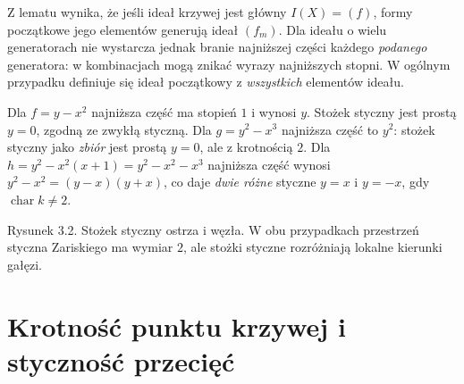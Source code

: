 Z lematu wynika, że jeśli ideał krzywej jest główny
$I(X)=(f)$, formy początkowe jego elementów generują
ideał $(f_m)$. Dla ideału o wielu generatorach nie wystarcza
jednak branie najniższej części każdego \emph{podanego}
generatora: w kombinacjach mogą znikać wyrazy najniższych
stopni. W ogólnym przypadku definiuje się ideał początkowy
z \emph{wszystkich} elementów ideału.

\begin{przyklad}
Dla $f=y-x^2$ najniższa część ma stopień $1$ i wynosi $y$.
Stożek styczny jest prostą $y=0$, zgodną ze zwykłą styczną.
Dla $g=y^2-x^3$ najniższa część to $y^2$:
stożek styczny jako \emph{zbiór} jest prostą $y=0$,
ale z krotnością $2$. Dla
$h=y^2-x^2(x+1)=y^2-x^2-x^3$ najniższa część
wynosi $y^2-x^2=(y-x)(y+x)$, co daje
\emph{dwie różne} styczne $y=x$ i $y=-x$,
gdy $\operatorname{char}k\ne2$.
\end{przyklad}

\begin{center}

\small Rysunek 3.2. Stożek styczny ostrza i węzła. W obu przypadkach
przestrzeń styczna Zariskiego ma wymiar $2$, ale stożki styczne
rozróżniają lokalne kierunki gałęzi.
\end{center}

\section{Krotność punktu krzywej i styczność przecięć}

